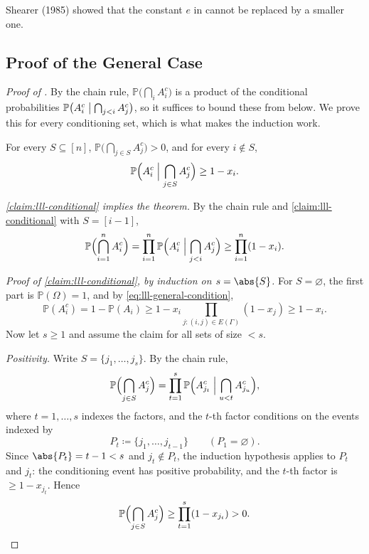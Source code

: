 \begin{remark}\label{rmk:shearer}
    Shearer (1985) showed that the constant \(e\) in  cannot be replaced by a smaller one.
\end{remark}

\subsection{Proof of the General Case}\label{sec:lll-general-proof}

\begin{proof}[Proof of {}]
    By the chain rule, \(\mathbb{P}\bigl( \bigcap_{i} A_{i}^{c} \bigr)\) is a product of the conditional probabilities \(\mathbb{P}\bigl( A_{i}^{c} \bigm| \bigcap_{j < i} A_{j}^{c} \bigr)\), so it suffices to bound these from below. We prove this for every conditioning set, which is what makes the induction work.
    \begin{claim}\label{claim:lll-conditional}
        For every \(S \subseteq [n]\), \(\mathbb{P}\bigl( \bigcap_{j \in S} A_{j}^{c} \bigr) > 0\), and for every \(i \notin S\),
        \[
            \mathbb{P}\Bigl( A_{i}^{c} \Bigm| \bigcap_{j \in S} A_{j}^{c} \Bigr) \ge 1 - x_{i} .
        \]
    \end{claim}

    \emph{\autoref{claim:lll-conditional} implies the theorem.} By the chain rule and \autoref{claim:lll-conditional} with \(S = [i-1]\),
    \[
        \mathbb{P}\Bigl( \bigcap_{i=1}^{n} A_{i}^{c} \Bigr)
        = \prod_{i=1}^{n} \mathbb{P}\Bigl( A_{i}^{c} \Bigm| \bigcap_{j < i} A_{j}^{c} \Bigr)
        \ge \prod_{i=1}^{n} (1 - x_{i}) .
    \]

    \emph{Proof of \autoref{claim:lll-conditional}, by induction on \(s = \abs{S}\).} For \(S = \varnothing\), the first part is \(\mathbb{P}(\Omega) = 1\), and by \eqref{eq:lll-general-condition},
    \[
        \mathbb{P}(A_{i}^{c}) = 1 - \mathbb{P}(A_{i}) \ge 1 - x_{i} \prod_{j : (i,j) \in E(\Gamma)} (1 - x_{j}) \ge 1 - x_{i} .
    \]
    Now let \(s \ge 1\) and assume the claim for all sets of size \(< s\).

    \emph{Positivity.} Write \(S = \{ j_{1}, \ldots, j_{s} \}\). By the chain rule,
    \[
        \mathbb{P}\Bigl( \bigcap_{j \in S} A_{j}^{c} \Bigr) = \prod_{t=1}^{s} \mathbb{P}\Bigl( A_{j_{t}}^{c} \Bigm| \bigcap_{u < t} A_{j_{u}}^{c} \Bigr),
    \]
    where \(t = 1, \ldots, s\) indexes the factors, and the \(t\)-th factor conditions on the events indexed by
    \[
        P_{t} \coloneqq \{ j_{1}, \ldots, j_{t-1} \} \qquad (P_{1} = \varnothing) .
    \]
    Since \(\abs{P_{t}} = t - 1 < s\) and \(j_{t} \notin P_{t}\), the induction hypothesis applies to \(P_{t}\) and \(j_{t}\): the conditioning event has positive probability, and the \(t\)-th factor is \(\ge 1 - x_{j_{t}}\). Hence
    \[
        \mathbb{P}\Bigl( \bigcap_{j \in S} A_{j}^{c} \Bigr) \ge \prod_{t=1}^{s} (1 - x_{j_{t}}) > 0 .
    \]


\end{proof}
